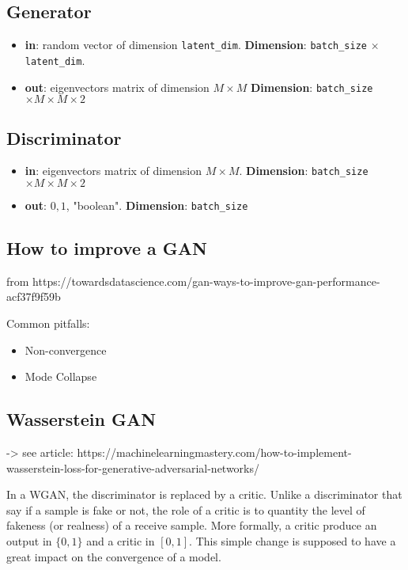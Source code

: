 \documentclass{article}
\begin{document}
\subsection{Generator}

\begin{itemize}
    \item \textbf{in}: random vector of dimension \lstinline{latent_dim}. \textbf{Dimension}: \lstinline{batch_size} $\times$ \lstinline{latent_dim}.
    \item \textbf{out}: eigenvectors matrix of dimension $M \times M$
    \textbf{Dimension}: \lstinline{batch_size} $\times M \times M \times 2$
\end{itemize}

\subsection{Discriminator}

\begin{itemize}
    \item \textbf{in}: eigenvectors matrix of dimension $M \times M$.
    \textbf{Dimension}: \lstinline{batch_size} $\times M \times M \times 2$
    \item \textbf{out}: ${0,1}$, "boolean". 
    \textbf{Dimension}: \lstinline{batch_size}
\end{itemize}

\subsection{How to improve a GAN}

from https://towardsdatascience.com/gan-ways-to-improve-gan-performance-acf37f9f59b

Common pitfalls:

\begin{itemize}
    \item Non-convergence
    \item Mode Collapse
    
\end{itemize}

\subsection{Wasserstein GAN}

-> see article: https://machinelearningmastery.com/how-to-implement-wasserstein-loss-for-generative-adversarial-networks/

In a WGAN, the discriminator is replaced by a critic. Unlike a discriminator that say if a sample is fake or not, the role of a critic is to quantity the level of fakeness (or realness) of a receive sample. More formally, a critic produce an output in $\{0,1\}$ and a critic in $[0,1]$. This simple change is supposed to have a great impact on the convergence of a model.
\end{document}
